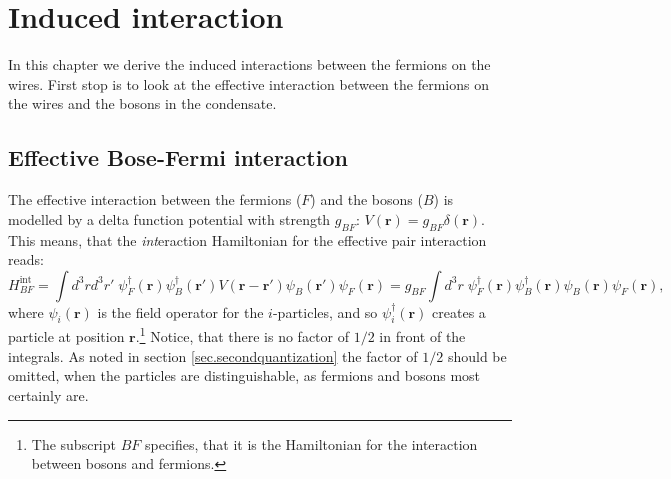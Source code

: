 
\chapter{Induced interaction} %

\label{Chapter3} %


In this chapter we derive the induced interactions between the fermions on the wires. First stop is to look at the effective interaction between the fermions on the wires and the bosons in the condensate.
\section{Effective Bose-Fermi interaction}
The effective interaction between the fermions ($F$) and the bosons ($B$) is modelled by a delta function potential with strength $g_{BF}$: $V(\mathbf{r})=g_{BF}\delta(\mathbf{r})$. This means, that the \textit{int}eraction Hamiltonian for the effective pair interaction reads:
\begin{equation}
H_{BF}^\text{int}  = \int d^3 r d^3 r' \; \psi_F^\dagger(\mathbf{r}) \psi_B^\dagger(\mathbf{r}')V(\mathbf{r}-\mathbf{r}')\psi_B(\mathbf{r}')\psi_F(\mathbf{r}) = g_{BF}\int d^3 r \; \psi_F^\dagger(\mathbf{r}) \psi_B^\dagger(\mathbf{r})\psi_B(\mathbf{r})\psi_F(\mathbf{r}),
\label{eq.HintBF}
\end{equation}
where $\psi_i(\mathbf{r})$ is the field operator for the $i$-particles, and so $\psi_i^\dagger(\mathbf{r})$ creates a particle at position $\mathbf{r}$.\footnote{The subscript $BF$ specifies, that it is the Hamiltonian for the interaction between bosons and fermions.} Notice, that there is no factor of $1/2$ in front of the integrals. As noted in section \ref{sec.secondquantization} the factor of $1/2$ should be omitted, when the particles are distinguishable, as fermions and bosons most certainly are. 

